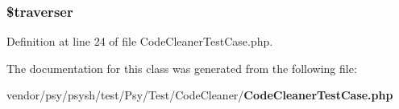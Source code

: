 \subsubsection[{\$traverser}]{\setlength{\rightskip}{0pt plus 5cm}\$traverser\hspace{0.3cm}{\ttfamily [protected]}}\label{class_psy_1_1_test_1_1_code_cleaner_1_1_code_cleaner_test_case_ae6725770c4bf11723bd3586bc0699c82}


Definition at line 24 of file Code\+Cleaner\+Test\+Case.\+php.



The documentation for this class was generated from the following file\+:\begin{DoxyCompactItemize}
\item 
vendor/psy/psysh/test/\+Psy/\+Test/\+Code\+Cleaner/{\bf Code\+Cleaner\+Test\+Case.\+php}\end{DoxyCompactItemize}
